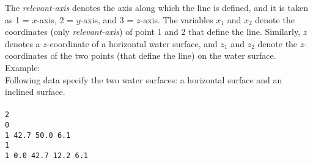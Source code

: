 The \emph{relevant-axis} denotes the axis along which the line is defined, and it is taken as 1 = $x$-axis, 2 = $y$-axis, and 3 = $z$-axis. The variables $x_1$ and $x_2$ denote the coordinates (only \emph{relevant-axis}) of point 1 and 2 that define the line. Similarly, $z$ denotes a $z$-coordinate of a horizontal water surface, and $z_1$ and $z_2$ denote the $z$-coordinates of the two points (that define the line) on the water surface.\\


Example:\\
Following data specify the two water surfaces: a horizontal surface and an inclined surface.\\\\
\texttt{2\\
0\\
1 42.7 50.0 6.1\\
1\\
1 0.0 42.7 12.2 6.1}\\

